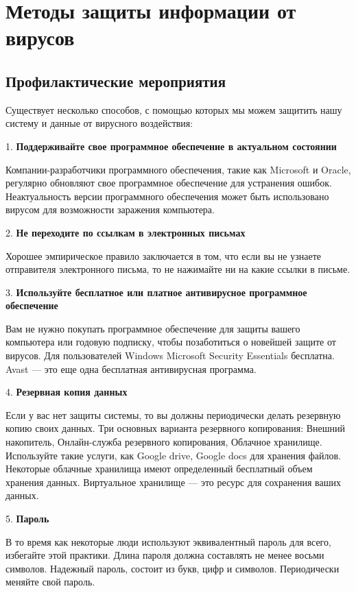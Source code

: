 \section{Методы защиты информации от вирусов}

\subsection{Профилактические мероприятия}

Существует несколько способов, с помощью которых мы можем защитить нашу систему и данные от вирусного воздействия: 

1.	 \textbf{Поддерживайте свое программное обеспечение в актуальном состоянии}

 Компании-разработчики программного обеспечения, такие как Microsoft и Oracle, регулярно обновляют свое программное обеспечение для устранения ошибок. Неактуальность версии программного обеспечения может быть использовано вирусом для возможности заражения компьютера.

 2.	\textbf{Не переходите по ссылкам в электронных письмах} 

Хорошее эмпирическое правило заключается в том, что если вы не узнаете отправителя электронного письма, то не нажимайте ни на какие ссылки в письме.

3.	\textbf{Используйте бесплатное или платное антивирусное программное обеспечение} 

Вам не нужно покупать программное обеспечение для защиты вашего компьютера или годовую подписку, чтобы позаботиться о новейшей защите от вирусов. Для пользователей Windows Microsoft Security Essentials бесплатна. Avast — это еще одна бесплатная антивирусная программа.

4.	\textbf{Резервная копия данных} 

Если у вас нет защиты системы, то вы должны периодически делать резервную копию своих данных. Три основных варианта резервного копирования: Внешний накопитель, Онлайн-служба резервного копирования, Облачное хранилище. Используйте такие услуги, как Google drive, Google docs для хранения файлов. Некоторые облачные хранилища имеют определенный бесплатный объем хранения данных. Виртуальное хранилище — это ресурс для сохранения ваших данных.

5.	\textbf{Пароль}


В то время как некоторые люди используют эквивалентный пароль для всего, избегайте этой практики. Длина пароля должна составлять не менее восьми символов. Надежный пароль, состоит из букв, цифр и символов. Периодически меняйте свой пароль.

